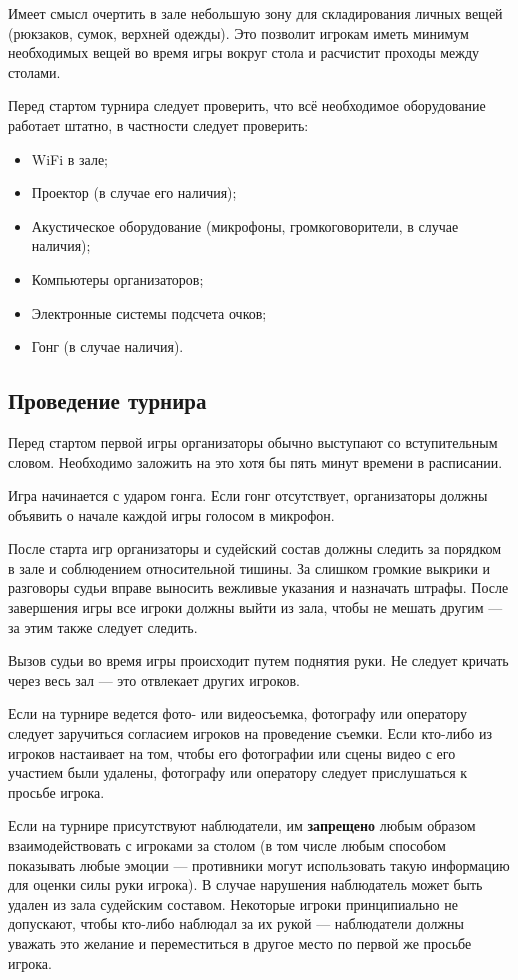 Имеет смысл очертить в зале небольшую зону для складирования личных вещей (рюкзаков, сумок, верхней одежды). Это позволит игрокам иметь минимум необходимых вещей во время игры вокруг стола и расчистит проходы между столами.

Перед стартом турнира следует проверить, что всё необходимое оборудование работает штатно, в частности следует проверить:
\begin{itemize}
	\item WiFi в зале;
	\item Проектор (в случае его наличия);
	\item Акустическое оборудование (микрофоны, громкоговорители, в случае наличия);
	\item Компьютеры организаторов;
	\item Электронные системы подсчета очков;
	\item Гонг (в случае наличия).
\end{itemize}

\subsection{Проведение турнира}

Перед стартом первой игры организаторы обычно выступают со вступительным словом. Необходимо заложить на это хотя бы пять минут времени в расписании.

Игра начинается с ударом гонга. Если гонг отсутствует, организаторы должны объявить о начале каждой игры голосом в микрофон.

После старта игр организаторы и судейский состав должны следить за порядком в зале и соблюдением относительной тишины. За слишком громкие выкрики и разговоры судьи вправе выносить вежливые указания и назначать штрафы. После завершения игры все игроки должны выйти из зала, чтобы не мешать другим --- за этим также следует следить.

Вызов судьи во время игры происходит путем поднятия руки. Не следует кричать через весь зал --- это отвлекает других игроков.

Если на турнире ведется фото- или видеосъемка, фотографу или оператору следует заручиться согласием игроков на проведение съемки. Если кто-либо из игроков настаивает на том, чтобы его фотографии или сцены видео с его участием были удалены, фотографу или оператору следует прислушаться к просьбе игрока.

Если на турнире присутствуют наблюдатели, им \textbf{запрещено} любым образом взаимодействовать с игроками за столом (в том числе любым способом показывать любые эмоции --- противники могут использовать такую информацию для оценки силы руки игрока). В случае нарушения наблюдатель может быть удален из зала судейским составом. Некоторые игроки принципиально не допускают, чтобы кто-либо наблюдал за их рукой --- наблюдатели должны уважать это желание и переместиться в другое место по первой же просьбе игрока.

